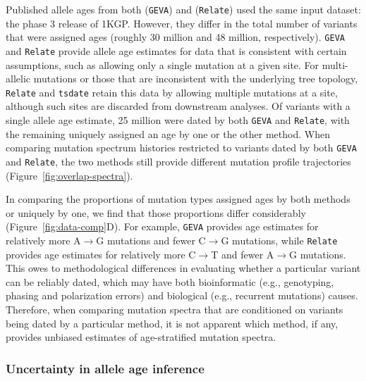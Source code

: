 \documentclass[]{article}
\newcommand{\GEVA}{\texttt{GEVA}\xspace}
\newcommand{\tsdate}{\texttt{tsdate}\xspace}
\newcommand{\relate}{\texttt{Relate}\xspace}
\begin{document}
Published allele ages from both \citet{albers2020dating} (\GEVA) and
\citet{speidel2019method} (\relate) used the same input dataset: the phase 3
release of 1KGP. However, they differ in the total number of variants that were
assigned ages (roughly 30 million and 48 million, respectively). \GEVA and
\relate provide allele age estimates for data that is consistent with certain
assumptions, such as allowing only a single mutation at a given site. For
multi-allelic mutations or those that are inconsistent with the underlying tree
topology, \relate and \tsdate retain this data by allowing multiple mutations
at a site, although such sites are discarded from downstream analyses. Of
variants with a single allele age estimate, 25 million were dated by both \GEVA
and \relate, with the remaining uniquely assigned an age by one or the other
method. When comparing mutation spectrum histories restricted to variants dated
by both \GEVA and \relate, the two methods still provide different mutation
profile trajectories (Figure~\ref{fig:overlap-spectra}).

In comparing the proportions of mutation types assigned ages by both methods or
uniquely by one, we find that those proportions differ considerably
(Figure~\ref{fig:data-comp}D). For example, \GEVA provides age estimates for
relatively more A$\rightarrow$G mutations and fewer C$\rightarrow$G mutations,
while \relate provides age estimates for relatively more C$\rightarrow$T and
fewer A$\rightarrow$G mutations. This owes to methodological differences in
evaluating whether a particular variant can be reliably dated, which may have
both bioinformatic (e.g., genotyping, phasing and polarization errors) and
biological (e.g., recurrent mutations) causes. Therefore, when comparing
mutation spectra that are conditioned on variants being dated by a particular
method, it is not apparent which method, if any, provides unbiased estimates of
age-stratified mutation spectra.

\subsubsection*{Uncertainty in allele age inference}
\end{document}
